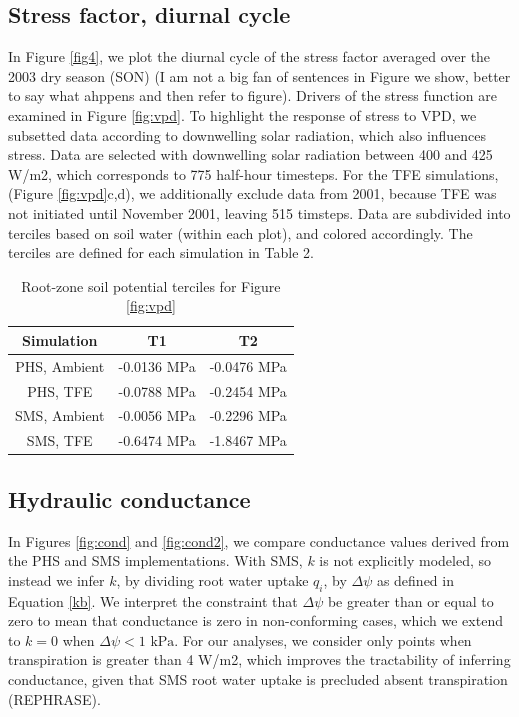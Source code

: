 \documentclass[draft,linenumbers]{agujournal}
\begin{document}
\subsection{Stress factor, diurnal cycle}
    In Figure \ref{fig4}, we plot the diurnal cycle of the stress factor averaged over the 2003 dry season (SON) (I am not a big fan of sentences in Figure we show, better to say what ahppens and then refer to figure).
    Drivers of the stress function are examined in Figure \ref{fig:vpd}.
    To highlight the response of stress to VPD, we subsetted data according to downwelling solar radiation, which also influences stress.
    Data are selected with downwelling solar radiation between 400 and 425 W/m2, which corresponds to 775 half-hour timesteps.
    For the TFE simulations, (Figure \ref{fig:vpd}c,d), we additionally exclude data from 2001, because TFE was not initiated until November 2001, leaving 515  timsteps.
    Data are subdivided into terciles based on soil water (within each plot), and colored accordingly.
    The terciles are defined for each simulation in Table 2.
\begin{table}
\caption{Root-zone soil potential terciles for Figure \ref{fig:vpd}}
\centering
\begin{tabular}{c c c }
Simulation & T1 & T2 \\
\hline
PHS, Ambient & -0.0136 MPa & -0.0476 MPa \\
PHS, TFE & -0.0788 MPa & -0.2454 MPa \\
SMS, Ambient & -0.0056 MPa & -0.2296 MPa \\
SMS, TFE & -0.6474 MPa & -1.8467 MPa \\
\hline

\end{tabular}
\end{table}
    

\subsection{Hydraulic conductance}
    In Figures \ref{fig:cond} and \ref{fig:cond2}, we compare conductance values derived from the PHS and SMS implementations.
    With SMS, $k$ is not explicitly modeled, so instead we infer $k$, 
    by dividing root water uptake $q_i$, by $\Delta\psi$ as defined in Equation \ref{kb}.
    We interpret the constraint that $\Delta\psi$ be greater than or equal to zero to mean 
    that conductance is zero in non-conforming cases, which we extend to $k=0$ when $\Delta\psi<\text{1 kPa}$.
    For our analyses, we consider only points when transpiration is greater than 4 W/m2, which improves the tractability of inferring conductance,
    given that SMS root water uptake is precluded absent transpiration (REPHRASE). 
    
\end{document}

